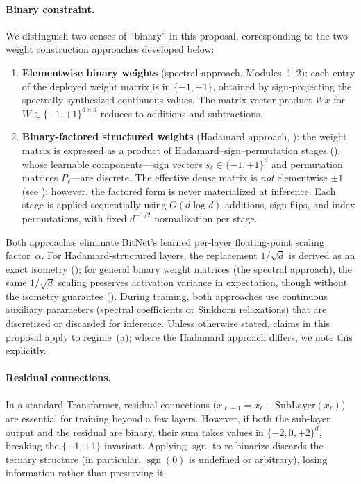 \documentclass[12pt,a4paper]{article}
\theoremstyle{plain}
\theoremstyle{definition}
\theoremstyle{remark}
\newcommand{\pmone}{\{-1,+1\}}
\newcommand{\sgn}{\operatorname{sgn}}
\begin{document}
\paragraph{Binary constraint.}
We distinguish two senses of ``binary'' in this proposal, corresponding to the two weight construction approaches developed below:
\begin{enumerate}[label=(\alph*)]
    \item \textbf{Elementwise binary weights} (spectral approach, Modules~1--2): each entry of the deployed weight matrix is in $\pmone$, obtained by sign-projecting the spectrally synthesized continuous values. The matrix-vector product $Wx$ for $W \in \pmone^{d \times d}$ reduces to additions and subtractions.
    \item \textbf{Binary-factored structured weights} (Hadamard approach, ): the weight matrix is expressed as a product of Hadamard--sign--permutation stages (), whose learnable components---sign vectors $s_\ell \in \pmone^d$ and permutation matrices $P_\ell$---are discrete. The effective dense matrix is \emph{not} elementwise $\pm 1$ (see ); however, the factored form is never materialized at inference. Each stage is applied sequentially using $O(d \log d)$ additions, sign flips, and index permutations, with fixed $d^{-1/2}$ normalization per stage.
\end{enumerate}
Both approaches eliminate BitNet's learned per-layer floating-point scaling factor~$\alpha$. For Hadamard-structured layers, the replacement $1/\sqrt{d}$ is derived as an exact isometry (); for general binary weight matrices (the spectral approach), the same $1/\sqrt{d}$ scaling preserves activation variance in expectation, though without the isometry guarantee (). During training, both approaches use continuous auxiliary parameters (spectral coefficients or Sinkhorn relaxations) that are discretized or discarded for inference. Unless otherwise stated, claims in this proposal apply to regime~(a); where the Hadamard approach differs, we note this explicitly.

\paragraph{Residual connections.}
In a standard Transformer, residual connections ($x_{\ell+1} = x_\ell + \text{SubLayer}(x_\ell)$) are essential for training beyond a few layers. However, if both the sub-layer output and the residual are binary, their sum takes values in $\{-2, 0, +2\}^d$, breaking the $\pmone$ invariant. Applying $\sgn$ to re-binarize discards the ternary structure (in particular, $\sgn(0)$ is undefined or arbitrary), losing information rather than preserving it.
\end{document}
